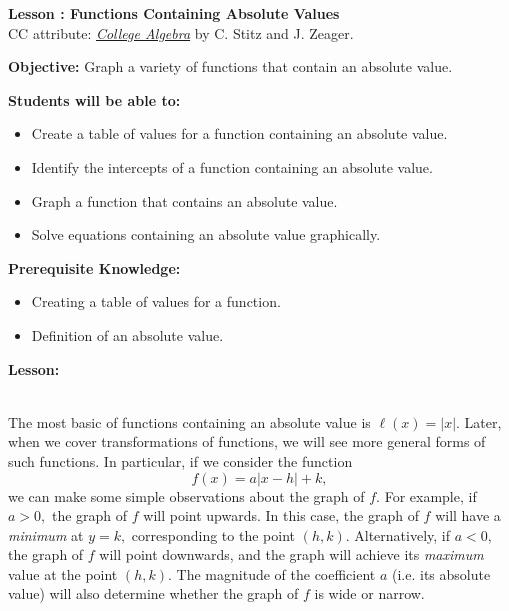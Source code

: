 \documentclass[12pt]{article}
\theoremstyle{definition}
\begin{document}
{\bf \large Lesson : Functions Containing Absolute Values}
\\ CC attribute: \href{http://www.stitz-zeager.com}{\it{College Algebra}} by C. Stitz and J. Zeager. 
\hfill \doclicenseImage[imagewidth=5em]\\
\par
{\bf Objective:} Graph a variety of functions that contain an absolute value.\\
\par
{\bf Students will be able to:}
\begin{itemize}
	\item Create a table of values for a function containing an absolute value.
	\item Identify the intercepts of a function containing an absolute value.
	\item Graph a function that contains an absolute value.
	\item Solve equations containing an absolute value graphically.
\end{itemize}
{\bf Prerequisite Knowledge:}
\begin{itemize}
	\item Creating a table of values for a function.
	\item Definition of an absolute value.
\end{itemize}
\hrulefill

{\bf Lesson:}\\
\ \par
The most basic of functions containing an absolute value is $\ell(x)=|x|$.  Later, when we cover transformations of functions, we will see more general forms of such functions.  In particular, if we consider the function
$$f(x)=a|x-h|+k,$$
we can make some simple observations about the graph of $f$.  For example, if $a>0,$ the graph of $f$ will point upwards.  In this case, the graph of $f$ will have a {\it minimum} at $y=k,$ corresponding to the point $(h,k)$.  Alternatively, if $a<0,$ the graph of $f$ will point downwards, and the graph will achieve its {\it maximum} value at the point $(h,k)$.  The magnitude of the coefficient $a$ (i.e. its absolute value) will also determine whether the graph of $f$ is wide or narrow.

\newpage
\end{document}
